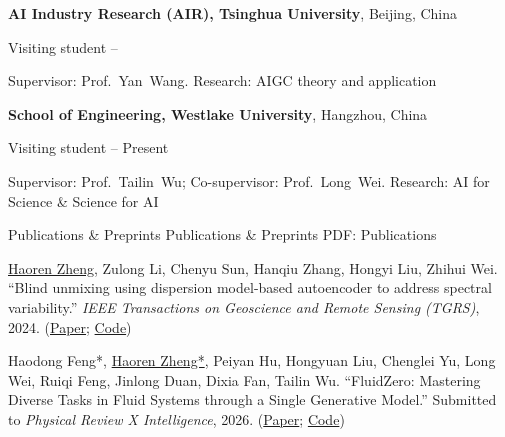 \documentclass[letterpaper,MMMyyyy,nonstopmode]{simpleresumecv}
\begin{document}
\begin{Body}
\Entry
{\textbf{AI Industry Research (AIR), Tsinghua University}},
Beijing, China

\Gap
\BulletItem
Visiting student
\hfill
{} --
\begin{Detail}
\SubBulletItem
Supervisor: Prof.~Yan~Wang.
\SubBulletItem
Research: AIGC theory and application
\end{Detail}

\BigGap
\Entry
{\textbf{School of Engineering, Westlake University}},
Hangzhou, China

\Gap
\BulletItem
Visiting student
\hfill
{} --
Present
\begin{Detail}
\SubBulletItem
Supervisor: Prof.~Tailin~Wu; Co-supervisor: Prof.~Long~Wei.
\SubBulletItem
Research: AI for Science \& Science for AI
\end{Detail}



\Section
{Publications \& Preprints}
{Publications \& Preprints}
{PDF: Publications}

\begingroup
\renewcommand{\MaxNumberedItem}{[6]}

\BigGap

\NumberedItem{[1]}
\underline{Haoren Zheng}, Zulong Li, Chenyu Sun, Hanqiu Zhang, Hongyi Liu, Zhihui Wei.
``Blind unmixing using dispersion model-based autoencoder to address spectral variability.''
\textit{IEEE Transactions on Geoscience and Remote Sensing (TGRS)}, 2024.
(\href{https://ieeexplore.ieee.org/document/10526310}{Paper};
\href{https://github.com/Puzhre/DMTS-Net}{Code})

\Gap
\NumberedItem{[2]}
Haodong Feng*, \underline{Haoren Zheng*}, Peiyan Hu, Hongyuan Liu, Chenglei Yu, Long Wei, Ruiqi Feng, Jinlong Duan, Dixia Fan, Tailin Wu.
``FluidZero: Mastering Diverse Tasks in Fluid Systems through a Single Generative Model.''
Submitted to \textit{Physical Review X Intelligence}, 2026.
(\href{https://assets-eu.researchsquare.com/files/rs-6881567/v1/63e5e81e0d8b6c9944a0c58d.pdf}{Paper};
\href{https://github.com/AI4Science-WestlakeU/FluidZero}{Code})


\end{Body}
\end{document}

